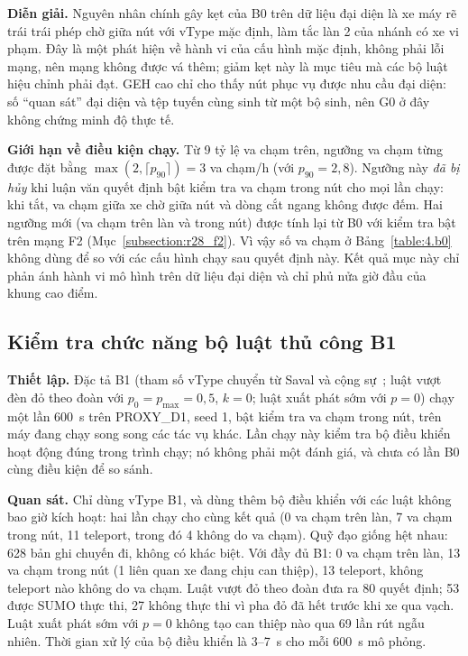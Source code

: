 \documentclass[../main.tex]{subfiles}
\begin{document}
\textbf{Diễn giải.} Nguyên nhân chính gây kẹt của B0 trên dữ liệu đại diện là xe máy rẽ trái trái phép chờ giữa nút với vType mặc định, làm tắc làn 2 của nhánh có xe vi phạm. Đây là một phát hiện về hành vi của cấu hình mặc định, không phải lỗi mạng, nên mạng không được vá thêm; giảm kẹt này là mục tiêu mà các bộ luật hiệu chỉnh phải đạt. GEH cao chỉ cho thấy nút phục vụ được nhu cầu đại diện: số ``quan sát'' đại diện và tệp tuyến cùng sinh từ một bộ sinh, nên G0 ở đây không chứng minh độ thực tế.

\textbf{Giới hạn về điều kiện chạy.} Từ 9 tỷ lệ va chạm trên, ngưỡng va chạm từng được đặt bằng $\max(2, \lceil p_{90} \rceil) = 3$ va chạm/h (với $p_{90} = 2{,}8$). Ngưỡng này \emph{đã bị hủy} khi luận văn quyết định bật kiểm tra va chạm trong nút cho mọi lần chạy: khi tắt, va chạm giữa xe chờ giữa nút và dòng cắt ngang không được đếm. Hai ngưỡng mới (va chạm trên làn và trong nút) được tính lại từ B0 với kiểm tra bật trên mạng F2 (Mục~\ref{subsection:r28_f2}). Vì vậy số va chạm ở Bảng~\ref{table:4.b0} không dùng để so với các cấu hình chạy sau quyết định này. Kết quả mục này chỉ phản ánh hành vi mô hình trên dữ liệu đại diện và chỉ phủ nửa giờ đầu của khung cao điểm.

\subsection{Kiểm tra chức năng bộ luật thủ công B1}
\label{subsection:b1_check}

\textbf{Thiết lập.} Đặc tả B1 (tham số vType chuyển từ Saval và cộng sự~\cite{saval2023mixed}; luật vượt đèn đỏ theo đoàn với $p_0 = p_{\max} = 0{,}5$, $k = 0$; luật xuất phát sớm với $p = 0$) chạy một lần 600~s trên PROXY\_D1, seed 1, bật kiểm tra va chạm trong nút, trên máy đang chạy song song các tác vụ khác. Lần chạy này kiểm tra bộ điều khiển hoạt động đúng trong trình chạy; nó không phải một đánh giá, và chưa có lần B0 cùng điều kiện để so sánh.

\textbf{Quan sát.} Chỉ dùng vType B1, và dùng thêm bộ điều khiển với các luật không bao giờ kích hoạt: hai lần chạy cho cùng kết quả (0 va chạm trên làn, 7 va chạm trong nút, 11 teleport, trong đó 4 không do va chạm). Quỹ đạo giống hệt nhau: 628 bản ghi chuyến đi, không có khác biệt. Với đầy đủ B1: 0 va chạm trên làn, 13 va chạm trong nút (1 liên quan xe đang chịu can thiệp), 13 teleport, không teleport nào không do va chạm. Luật vượt đỏ theo đoàn đưa ra 80 quyết định; 53 được SUMO thực thi, 27 không thực thi vì pha đỏ đã hết trước khi xe qua vạch. Luật xuất phát sớm với $p = 0$ không tạo can thiệp nào qua 69 lần rút ngẫu nhiên. Thời gian xử lý của bộ điều khiển là 3--7~s cho mỗi 600~s mô phỏng.
\end{document}
